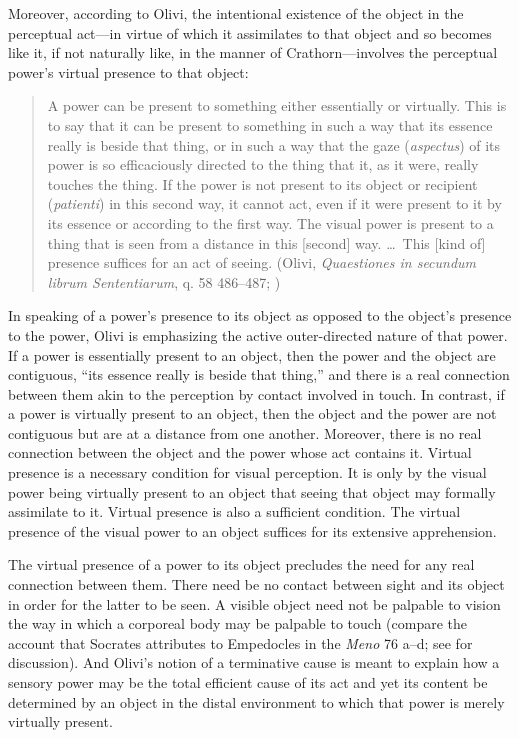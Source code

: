 Moreover, according to Olivi, the intentional existence of the object in the perceptual act---in virtue of which it assimilates to that object and so becomes like it, if not naturally like, in the manner of Crathorn---involves the perceptual power's virtual presence to that object: 
\begin{quote}
	A power can be present to something either essentially or virtually. This is to say that it can be present to something in such a way that its essence really is beside that thing, or in such a way that the gaze (\emph{aspectus}) of its power is so efficaciously directed to the thing that it, as it were, really touches the thing. If the power is not present to its object or recipient (\emph{patienti}) in this second way, it cannot act, even if it were present to it by its essence or according to the first way. The visual power is present to a thing that is seen from a distance in this [second] way. \dots\ This [kind of] presence suffices for an act of seeing. (Olivi, \emph{Quaestiones in secundum librum Sententiarum}, q. 58 486--487; \citealt[151--152]{Toivanen:2013ul})
\end{quote}
In speaking of a power's presence to its object as opposed to the object's presence to the power, Olivi is emphasizing the active outer-directed nature of that power. If a power is essentially present to an object, then the power and the object are contiguous, ``its essence really is beside that thing,'' and there is a real connection between them akin to the perception by contact involved in touch. In contrast, if a power is virtually present to an object, then the object and the power are not contiguous but are at a distance from one another. Moreover, there is no real connection between the object and the power whose act contains it. Virtual presence is a necessary condition for visual perception. It is only by the visual power being virtually present to an object that seeing that object may formally assimilate to it. Virtual presence is also a sufficient condition. The virtual presence of the visual power to an object suffices for its extensive apprehension. 

The virtual presence of a power to its object precludes the need for any real connection between them. There need be no contact between sight and its object in order for the latter to be seen. A visible object need not be palpable to vision the way in which a corporeal body may be palpable to touch (compare the account that Socrates attributes to Empedocles in the \emph{Meno} 76 a--d; see \citealt[chapter 1.2]{Kalderon:2015fr} for discussion). And Olivi's notion of a terminative cause is meant to explain how a sensory power may be the total efficient cause of its act and yet its content be determined by an object in the distal environment to which that power is merely virtually present.

